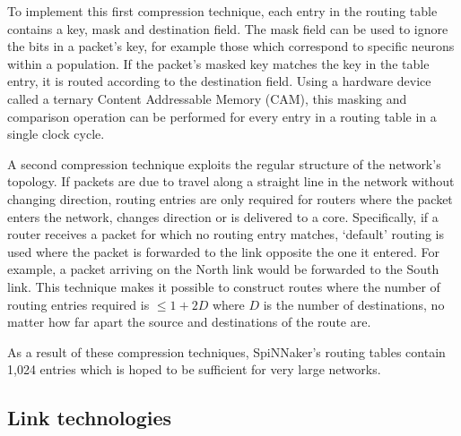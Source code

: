 			To implement this first compression technique, each entry in the routing
			table contains a key, mask and destination field. The mask field can be
			used to ignore the bits in a packet's key, for example those which
			correspond to specific neurons within a population. If the packet's masked
			key matches the key in the table entry, it is routed according to the
			destination field. Using a hardware device called a ternary Content
			Addressable Memory (CAM), this masking and comparison operation can be
			performed for every entry in a routing table in a single clock cycle.
			
			A second compression technique exploits the regular structure of the
			network's topology. If packets are due to travel along a straight line in
			the network without changing direction, routing entries are only required
			for routers where the packet enters the network, changes direction or is
			delivered to a core. Specifically, if a router receives a packet for which
			no routing entry matches, `default' routing is used where the packet is
			forwarded to the link opposite the one it entered. For example, a packet
			arriving on the North link would be forwarded to the South link. This
			technique makes it possible to construct routes where the number of
			routing entries required is $\le 1 + 2D$ where $D$ is the number of
			destinations, no matter how far apart the source and destinations of the
			route are.
			
			As a result of these compression techniques, SpiNNaker's routing tables
			contain 1,024 entries which is hoped to be sufficient for very large
			networks.
		
		\subsection{Link technologies}
			
			
